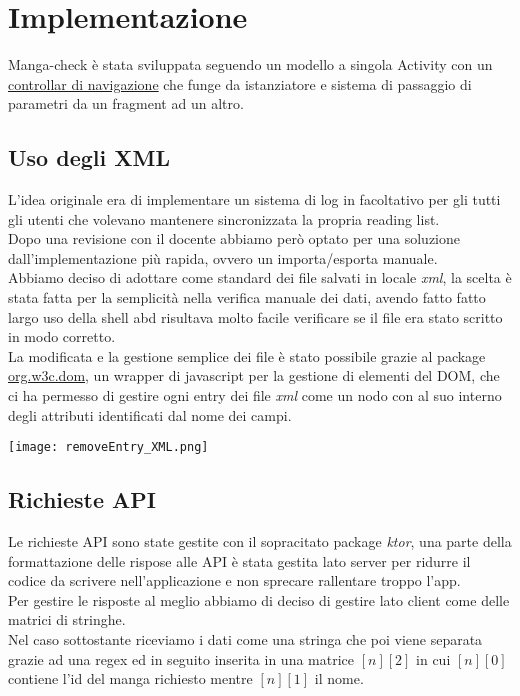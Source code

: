 \documentclass[../Assignment-3-LPSMT.tex]{subfiles}
\begin{document}
\chapter{Implementazione}

Manga-check è stata sviluppata seguendo un modello a singola Activity con un
\href{https://developer.android.com/guide/navigation}{controllar di navigazione}
che funge da istanziatore e sistema di passaggio di parametri da un fragment ad un altro.\\

\section{Uso degli XML}

L'idea originale era di implementare un sistema di log in facoltativo per gli tutti gli utenti che volevano mantenere sincronizzata la propria reading list.\\
Dopo una revisione con il docente abbiamo però optato per una soluzione dall'implementazione più rapida, ovvero un importa/esporta manuale.\\
Abbiamo deciso di adottare come standard dei file salvati in locale \emph{xml}, la scelta è stata fatta per la semplicità nella verifica manuale dei dati, avendo fatto fatto largo uso della shell abd risultava molto facile verificare se il file era stato scritto in modo corretto.\\
La modificata e la gestione semplice dei file è stato possibile grazie al package \href{https://kotlinlang.org/api/latest/jvm/stdlib/org.w3c.dom/}{org.w3c.dom}, un wrapper di javascript per la gestione di elementi del DOM, che ci ha permesso di gestire ogni entry dei file \emph{xml} come un nodo con al suo interno degli attributi identificati dal nome dei campi.

\begin{center}
  \texttt{[image: removeEntry\_XML.png]}
\end{center}

\section{Richieste API}

Le richieste API sono state gestite con il sopracitato package \emph{ktor}, una parte della formattazione delle rispose alle API è stata gestita lato server per ridurre il codice da scrivere nell'applicazione e non sprecare rallentare troppo l'app.\\
Per gestire le risposte al meglio abbiamo di deciso di gestire lato client come delle matrici di stringhe.\\
Nel caso sottostante riceviamo i dati come una stringa che poi viene separata grazie ad una regex ed in seguito inserita in una matrice $[n][2]$ in cui $[n][0]$ contiene l'id del manga richiesto mentre $[n][1]$ il nome.
\end{document}
